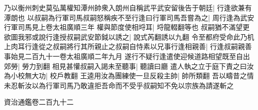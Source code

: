乃以衡州刺史莫弘萬權知潭州帥衆入朗州自稱武平武安留後告于朝廷|{
	行逢欲兼有潭朗也}
以叔嗣為行軍司馬叔嗣怒稱疾不至行逢曰行軍司馬吾嘗為之|{
	周行逢為武安行軍司馬見上卷太祖廣順三年}
權與節度使相埒耳|{
	埒龍輟翻等也}
叔嗣猶不滿望更欲圖我邪或說行逢授叔嗣武安節鉞以誘之|{
	說式芮翻誘以九翻}
令至都府受命此乃机上肉耳行逢從之叔嗣將行其所親止之叔嗣自恃素以兄事行逢相親善|{
	行逢叔嗣親善事始見二百九十一卷太祖廣順二年九月}
遂行不疑行逢遣使迎候道路相望既至自出郊勞|{
	勞力到翻}
相見甚懽叔嗣入謁未至聽事|{
	聽讀曰廳}
遣人執之立于庭下責之曰汝為小校無大功|{
	校戶教翻}
王逵用汝為團練使一旦反殺主帥|{
	帥所類翻}
吾以疇昔之情未忍斬汝以為行軍司馬乃敢違拒吾命而不受乎叔嗣知不免以宗族為請遂斬之

資治通鑑卷二百九十二
























































































